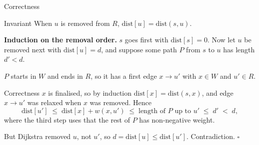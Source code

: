 \documentclass[10pt,aspectratio=169]{beamer}
\begin{document}
\begin{frame}{Correctness}
  \begin{block}{Invariant}
    When $u$ is removed from $R$, $\text{dist}[u] = \text{dist}(s, u)$.
  \end{block}

  \bigskip
  \textbf{Induction on the removal order.} $s$ goes first with
  $\text{dist}[s] = 0$. Now let $u$ be removed next with
  $\text{dist}[u] = d$, and suppose some path $P$ from $s$ to $u$ has length
  $d' < d$.

  \bigskip
  \begin{center}
  \end{center}

  \small $P$ starts in $W$ and ends in $R$, so it has a first edge $x \to u'$
  with $x \in W$ and $u' \in R$.
\end{frame}

\begin{frame}{Correctness}
  $x$ is finalised, so by induction $\text{dist}[x] = \text{dist}(s, x)$,
  and edge $x \to u'$ was relaxed when $x$ was removed. Hence
  \[
    \text{dist}[u']
    \;\le\; \text{dist}[x] + w(x, u')
    \;\le\; \text{length of } P \text{ up to } u'
    \;\le\; d'
    \;<\; d,
  \]
  where the third step uses that the rest of $P$ has
  \alert{non-negative} weight.

  \pause
  \bigskip
  But Dijkstra removed $u$, not $u'$, so $d = \text{dist}[u] \le
  \text{dist}[u']$. Contradiction. $\square$
\end{frame}
\end{document}
